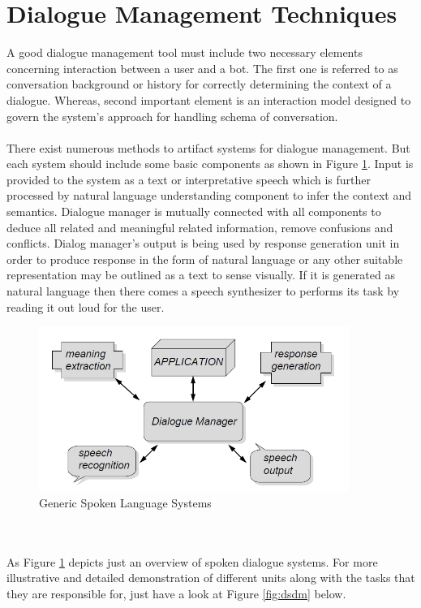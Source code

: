 \section{Dialogue Management Techniques}
A good dialogue management tool must include two necessary elements concerning interaction between a user and a bot. The first one is referred to as conversation background or history for correctly determining the context of a dialogue. Whereas, second important element is an interaction model designed to govern the system's approach for handling schema of conversation. \cite{dialoguemanagementsystems}
\\~\\
There exist numerous methods to artifact systems for dialogue management. But each system should include some basic components as shown in Figure \ref{fig:gsls}. Input is provided to the system as a text or interpretative speech which is further processed by natural language understanding component to infer the context and semantics. Dialogue manager is mutually connected with all components to deduce all related and meaningful related information, remove confusions and conflicts. Dialog manager's output is being used by response generation unit in order to produce response in the form of natural language or any other suitable representation may be outlined as a text to sense visually. If it is generated as natural language then there comes a speech synthesizer to performs its task by reading it out loud for the user. \cite{dialoguemanagementsystems} 
\begin{figure}[h]
    \centering
    \includegraphics[width=0.9\textwidth]{img/Generic_Spoken_Language_System.PNG}
    \caption{Generic Spoken Language Systems \cite{dialoguemanagementsystems}}
    \label{fig:gsls}
\end{figure}
\\~\\
As Figure \ref{fig:gsls} depicts just an overview of spoken dialogue systems. For more illustrative and detailed demonstration of different units along with the tasks that they are responsible for, just have a look at Figure \ref{fig:dsdm} below.
